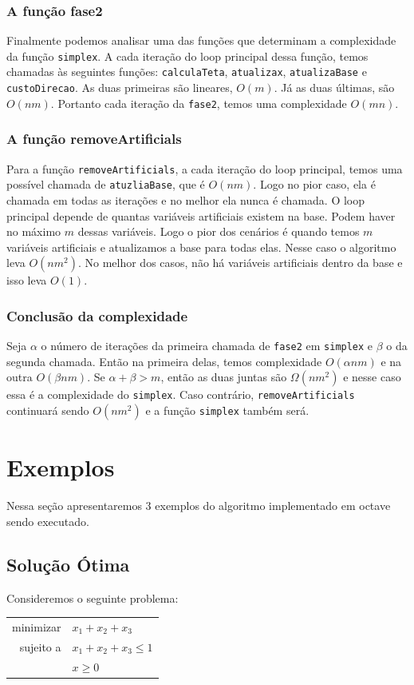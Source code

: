 \documentclass[12pt]{article}
\begin{document}
\subsubsection{A função fase2}
Finalmente podemos analisar uma das funções que determinam a complexidade da função \texttt{simplex}. A cada iteração do loop principal dessa função, temos chamadas às seguintes funções: \texttt{calculaTeta}, \texttt{atualizax}, \texttt{atualizaBase} e \texttt{custoDirecao}. As duas primeiras são lineares, $O(m)$. Já as duas últimas, são $O(nm)$. Portanto cada iteração da \texttt{fase2}, temos uma complexidade $O(mn)$.

\subsubsection{A função removeArtificials}
Para a função \texttt{removeArtificials}, a cada iteração do loop principal, temos uma possível chamada de \texttt{atuzliaBase}, que é $O(nm)$. Logo no pior caso, ela é chamada em todas as iterações e no melhor ela nunca é chamada. O loop principal depende de quantas variáveis artificiais existem na base. Podem haver no máximo $m$ dessas variáveis. Logo o pior dos cenários é quando temos $m$ variáveis artificiais e atualizamos a base para todas elas. Nesse caso o algoritmo leva $O(nm^2)$. No melhor dos casos, não há variáveis artificiais dentro da base e isso leva $O(1)$.

\subsubsection{Conclusão da complexidade}
Seja $\alpha$ o número de iterações da primeira chamada de \texttt{fase2} em \texttt{simplex} e $\beta$ o da segunda chamada. Então na primeira delas, temos complexidade $O(\alpha n m)$ e na outra $O(\beta n m)$. Se $\alpha + \beta > m$, então as duas juntas são $\Omega(nm^2)$ e nesse caso essa é a complexidade do \texttt{simplex}. Caso contrário, \texttt{removeArtificials} continuará sendo $O(nm^2)$ e a função \texttt{simplex} também será.



\newpage
\section{Exemplos}
	Nessa seção apresentaremos 3 exemplos do algoritmo implementado em octave sendo executado. 
	
	\subsection{Solução Ótima}
		Consideremos o seguinte problema:
	\begin{center}	
    	\begin{tabular}{r l}
	  		minimizar & $x_1 + x_2 + x_3$ \\
        
        	sujeito a & $x_1 + x_2 + x_3 \leq 1$ \\
            & $x \geq 0$ \\
        \end{tabular}
    \end{center}
    
\end{document}
